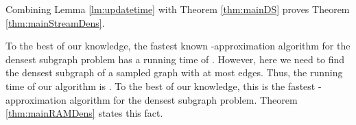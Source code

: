 Combining Lemma \ref{lm:updatetime} with Theorem \ref{thm:mainDS} proves Theorem \ref{thm:mainStreamDens}.


To the best of our knowledge, the fastest known -approximation algorithm for the densest subgraph problem has a running time of . However, here we need to find the densest subgraph of a sampled graph with at most  edges. Thus, the running time of our algorithm is . To the best of our knowledge, this is the fastest -approximation algorithm for the densest subgraph problem.
Theorem \ref{thm:mainRAMDens} states this fact.
